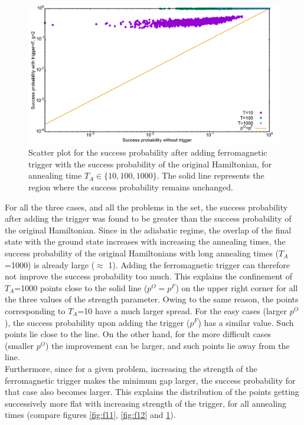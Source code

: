 \documentclass[12]{article}
\begin{document}
\begin{figure}[H]
\centering
\includegraphics[scale=0.3]{Scatt_s12_F_g2.png}
\caption{Scatter plot for the success probability after adding ferromagnetic trigger with the success probability of the original Hamiltonian, for annealing time $T_A \in \{10,100,1000\}$. The solid line represents the region where the success probability remains unchanged.}
\label{fig:f13}
\end{figure}

For all the three cases, and all the problems in the set, the success probability after adding the trigger was found to be greater than the success probability of the original Hamiltonian. Since in the adiabatic regime, the overlap of the final state with the ground state increases with increasing the annealing times, the success probability of the original Hamiltonians with long annealing times ($T_A$=1000) is already large ($\approx$ 1). Adding the ferromagnetic trigger can therefore not improve the success probability too much. This explains the confinement of $T_A$=1000 points close to the solid line ($p^O=p^F$) on the upper right corner for all the three values of the strength parameter. Owing to the same reason, the points corresponding to $T_A$=10 have a much larger spread. For the easy cases (larger $p^O$), the success probability upon adding the trigger ($p^F$) has a similar value. Such points lie close to the line. On the other hand, for the more difficult cases (smaller $p^O$) the improvement can be larger, and such points lie away from the line.\\

Furthermore, since for a given problem, increasing the strength of the ferromagnetic trigger makes the minimum gap larger, the success probability for that case also becomes larger. This explains the distribution of the points getting successively more flat with increasing strength of the trigger, for all annealing times (compare figures \ref{fig:f11}, \ref{fig:f12} and \ref{fig:f13}).\\
\end{document}
